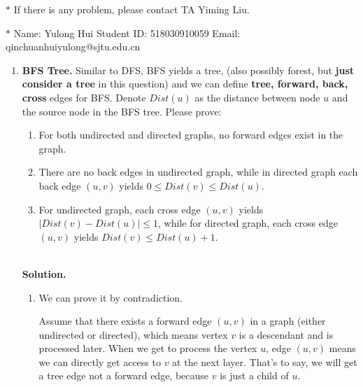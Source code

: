 \documentclass[12pt,a4paper]{article}
\theoremstyle{definition}
\begin{document}
\noindent

\noindent{}
\begin{center}
\footnotesize{\color{red}$*$ If there is any problem, please contact TA Yiming Liu.}

\footnotesize{\color{blue}$*$ Name: Yulong Hui  \quad Student ID: 518030910059 \quad Email: qinchuanhuiyulong@sjtu.edu.cn }
\end{center}

\begin{enumerate}
    \item
    \textbf{BFS Tree.} Similar to DFS, BFS yields a tree, (also possibly forest, but \textbf{just consider a tree} in this question) and we can define \textbf{tree, forward, back, cross} edges for BFS. Denote $Dist(u)$ as the distance between node $u$ and the source node in the BFS tree. Please prove:
    \begin{enumerate}
    	\item For both undirected and directed graphs, no forward edges exist in the graph.
    	
    	\item There are no back edges in undirected graph, while in directed graph each back edge $(u,v)$ yields $0\leq Dist(v)\leq Dist(u)$.
    	
    	\item For undirected graph, each cross edge $(u,v)$ yields $|Dist(v)-Dist(u)|\le 1$, while for directed graph, each cross edge $(u,v)$ yields $Dist(v)\leq Dist(u)+1$.
    	
    \end{enumerate}

~\\
   \textbf{Solution.}
   
   \begin{enumerate}
 	\item We can prove it by contradiction. 
 	
 	Assume that there exists a forward edge $(u,v)$ in a graph (either undirected or directed), which means vertex $v$ is a descendant and is processed later. When we get to process the vertex $u$, edge $(u,v)$ means we can directly get access to $v$ at the next layer. That's to say, we will get a tree edge not a forward edge, because $v$ is just a child of $u$.
 	

\end{enumerate}
\end{enumerate}
\end{document}
